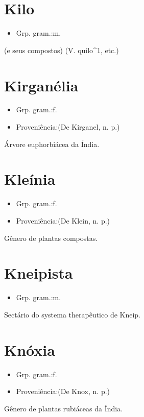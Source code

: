 \documentclass{article}
\begin{document}
\section{Kilo}
\begin{itemize}
\item {Grp. gram.:m.}
\end{itemize}
(e seus compostos)
(V. \textunderscore quilo\textunderscore ^1, etc.)
\section{Kirganélia}
\begin{itemize}
\item {Grp. gram.:f.}
\end{itemize}
\begin{itemize}
\item {Proveniência:(De \textunderscore Kirganel\textunderscore , n. p.)}
\end{itemize}
Árvore euphorbiácea da Índia.
\section{Kleínia}
\begin{itemize}
\item {Grp. gram.:f.}
\end{itemize}
\begin{itemize}
\item {Proveniência:(De \textunderscore Klein\textunderscore , n. p.)}
\end{itemize}
Gênero de plantas compostas.
\section{Kneipista}
\begin{itemize}
\item {Grp. gram.:m.}
\end{itemize}
Sectário do systema therapêutico de Kneip.
\section{Knóxia}
\begin{itemize}
\item {Grp. gram.:f.}
\end{itemize}
\begin{itemize}
\item {Proveniência:(De \textunderscore Knox\textunderscore , n. p.)}
\end{itemize}
Gênero de plantas rubiáceas da Índia.
\end{document}
